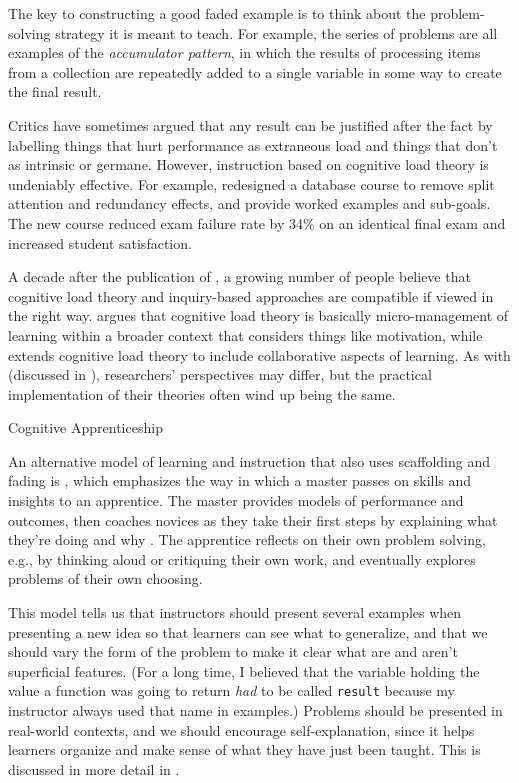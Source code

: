 The key to constructing a good faded example is to think about the
problem-solving strategy it is meant to teach.  For example, the
series of problems are all examples of the \emph{accumulator pattern},
in which the results of processing items from a collection are
repeatedly added to a single variable in some way to create the final
result.

Critics have sometimes argued that any result can be justified after
the fact by labelling things that hurt performance as extraneous load
and things that don't as intrinsic or germane.  However, instruction
based on cognitive load theory is undeniably effective.  For example,
\cite{Maso2016} redesigned a database course to remove split attention
and redundancy effects, and provide worked examples and sub-goals.
The new course reduced exam failure rate by 34\% on an identical final
exam and increased student satisfaction.

A decade after the publication of \cite{Kirs2006}, a growing number of
people believe that cognitive load theory and inquiry-based approaches
are compatible if viewed in the right way.  \cite{Kaly2015} argues
that cognitive load theory is basically micro-management of learning
within a broader context that considers things like motivation, while
\cite{Kirs2018} extends cognitive load theory to include collaborative
aspects of learning.  As with \cite{Mark2018} (discussed in
), researchers' perspectives may
differ, but the practical implementation of their theories often wind
up being the same.

\begin{callout}{Cognitive Apprenticeship}

  An alternative model of learning and instruction that also uses
  scaffolding and fading is
  ,
  which emphasizes the way in which a master passes on skills and
  insights to an apprentice.  The master provides models of
  performance and outcomes, then coaches novices as they take their
  first steps by explaining what they're doing and why
  \cite{Coll1991,Casp2007}.  The apprentice reflects on their own
  problem solving, e.g., by thinking aloud or critiquing their own
  work, and eventually explores problems of their own choosing.

  This model tells us that instructors should present several examples
  when presenting a new idea so that learners can see what to
  generalize, and that we should vary the form of the problem to make
  it clear what are and aren't superficial features.  (For a long
  time, I believed that the variable holding the value a function was
  going to return \emph{had} to be called \texttt{result} because my
  instructor always used that name in examples.)  Problems should be
  presented in real-world contexts, and we should encourage
  self-explanation, since it helps learners organize and make sense of
  what they have just been taught.  This is discussed in more detail
  in .

\end{callout}

